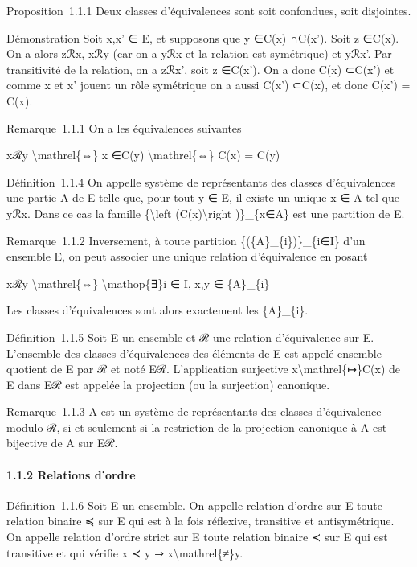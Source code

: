 \documentclass[]{article}
\begin{document}
Proposition~1.1.1 Deux classes d'équivalences sont soit confondues, soit
disjointes.

Démonstration Soit x,x' ∈ E, et supposons que y ∈C(x) ∩C(x'). Soit z
∈C(x). On a alors zℛx, xℛy (car on a yℛx et la relation est symétrique)
et yℛx'. Par transitivité de la relation, on a zℛx', soit z ∈C(x'). On a
donc C(x) ⊂C(x') et comme x et x' jouent un rôle symétrique on a aussi
C(x') ⊂C(x), et donc C(x') = C(x).

Remarque~1.1.1 On a les équivalences suivantes

xℛy \textbackslash{}mathrel\{⇔\} x ∈C(y) \textbackslash{}mathrel\{⇔\}
C(x) = C(y)

Définition~1.1.4 On appelle système de représentants des classes
d'équivalences une partie A de E telle que, pour tout y ∈ E, il existe
un unique x ∈ A tel que yℛx. Dans ce cas la famille
\{\textbackslash{}left (C(x)\textbackslash{}right )\}\_\{x∈A\} est une
partition de E.

Remarque~1.1.2 Inversement, à toute partition
\{(\{A\}\_\{i\})\}\_\{i∈I\} d'un ensemble E, on peut associer une unique
relation d'équivalence en posant

xℛy \textbackslash{}mathrel\{⇔\} \textbackslash{}mathop\{∃\}i ∈ I, x,y ∈
\{A\}\_\{i\}

Les classes d'équivalences sont alors exactement les \{A\}\_\{i\}.

Définition~1.1.5 Soit E un ensemble et ℛ une relation d'équivalence sur
E. L'ensemble des classes d'équivalences des éléments de E est appelé
ensemble quotient de E par ℛ et noté E∕ℛ. L'application surjective
x\textbackslash{}mathrel\{↦\}C(x) de E dans E∕ℛ est appelée la
projection (ou la surjection) canonique.

Remarque~1.1.3 A est un système de représentants des classes
d'équivalence modulo ℛ, si et seulement si la restriction de la
projection canonique à A est bijective de A sur E∕ℛ.

\paragraph{1.1.2 Relations d'ordre}

Définition~1.1.6 Soit E un ensemble. On appelle relation d'ordre sur E
toute relation binaire ≼ sur E qui est à la fois réflexive, transitive
et antisymétrique. On appelle relation d'ordre strict sur E toute
relation binaire ≺ sur E qui est transitive et qui vérifie x ≺ y ⇒
x\textbackslash{}mathrel\{≠\}y.
\end{document}
